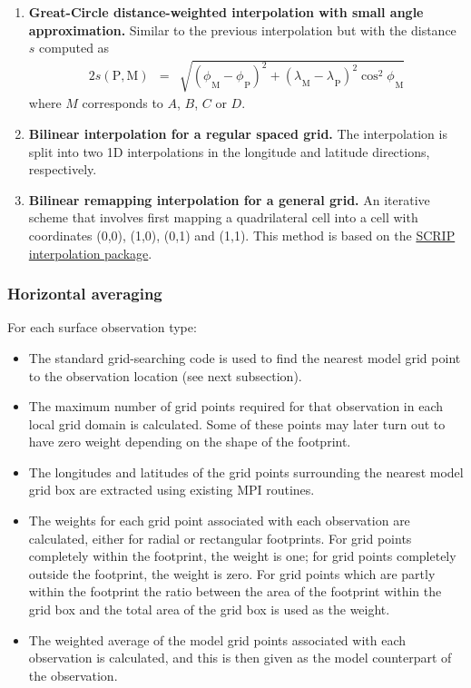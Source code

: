 \documentclass[../main/NEMO_manual]{subfiles}
\begin{document}
\begin{enumerate}
\item {\bfseries Great-Circle distance-weighted interpolation with small angle approximation.}
  Similar to the previous interpolation but with the distance $s$ computed as
  \begin{alignat*}{2}
    s\left( {\mathrm P}, {\mathrm M} \right)
    & = & \sqrt{ \left( {\phi_{}}_{\mathrm M} - {\phi_{}}_{\mathrm P} \right)^{2}
                                      + \left( {\lambda_{}}_{\mathrm M} - {\lambda_{}}_{\mathrm P} \right)^{2}
                                      \cos^{2} {\phi_{}}_{\mathrm M} }
  \end{alignat*}
  where $M$ corresponds to $A$, $B$, $C$ or $D$.

\item {\bfseries Bilinear interpolation for a regular spaced grid.}
  The interpolation is split into two 1D interpolations in the longitude and latitude directions, respectively.

\item {\bfseries Bilinear remapping interpolation for a general grid.}
  An iterative scheme that involves first mapping a quadrilateral cell into
  a cell with coordinates (0,0), (1,0), (0,1) and (1,1).
  This method is based on the \href{https://github.com/SCRIP-Project/SCRIP}{SCRIP interpolation package}.

\end{enumerate}

\subsubsection{Horizontal averaging}

For each surface observation type:
\begin{itemize}
\item The standard grid-searching code is used to find the nearest model grid point to the observation location
  (see next subsection).
\item The maximum number of grid points required for that observation in each local grid domain is calculated. Some of these points may later turn out to have zero weight depending on the shape of the footprint.
\item The longitudes and latitudes of the grid points surrounding the nearest model grid box are extracted using
  existing MPI routines.
\item The weights for each grid point associated with each observation are calculated,
  either for radial or rectangular footprints.
  For grid points completely within the footprint, the weight is one;
  for grid points completely outside the footprint, the weight is zero.
  For grid points which are partly within the footprint the ratio between the area of the footprint within
  the grid box and the total area of the grid box is used as the weight.
\item The weighted average of the model grid points associated with each observation is calculated,
  and this is then given as the model counterpart of the observation.
\end{itemize}
\end{document}
